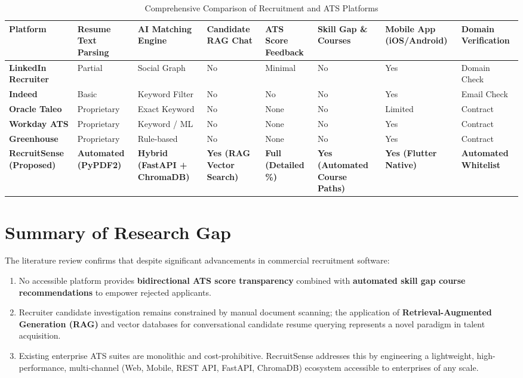 \begin{table}[h!]
\centering
\scriptsize
\caption{Comprehensive Comparison of Recruitment and ATS Platforms}
\label{tab:comparison_marketplaces}
\begin{tabular}{|p{2.6cm}|p{1.4cm}|p{1.8cm}|p{1.8cm}|p{1.6cm}|p{1.6cm}|p{1.6cm}|p{1.6cm}|}
\hline
\textbf{Platform} & \textbf{Resume Text Parsing} & \textbf{AI Matching Engine} & \textbf{Candidate RAG Chat} & \textbf{ATS Score Feedback} & \textbf{Skill Gap \& Courses} & \textbf{Mobile App (iOS/Android)} & \textbf{Domain Verification} \\ \hline
\textbf{LinkedIn Recruiter} & Partial & Social Graph & No & Minimal & No & Yes & Domain Check \\ \hline
\textbf{Indeed} & Basic & Keyword Filter & No & No & No & Yes & Email Check \\ \hline
\textbf{Oracle Taleo} & Proprietary & Exact Keyword & No & None & No & Limited & Contract \\ \hline
\textbf{Workday ATS} & Proprietary & Keyword / ML & No & None & No & Yes & Contract \\ \hline
\textbf{Greenhouse} & Proprietary & Rule-based & No & None & No & Yes & Contract \\ \hline
\textbf{RecruitSense (Proposed)} & \textbf{Automated (PyPDF2)} & \textbf{Hybrid (FastAPI + ChromaDB)} & \textbf{Yes (RAG Vector Search)} & \textbf{Full (Detailed \%)} & \textbf{Yes (Automated Course Paths)} & \textbf{Yes (Flutter Native)} & \textbf{Automated Whitelist} \\ \hline
\end{tabular}
\end{table}

\section{Summary of Research Gap}
The literature review confirms that despite significant advancements in commercial recruitment software:
\begin{enumerate}
    \item No accessible platform provides \textbf{bidirectional ATS score transparency} combined with \textbf{automated skill gap course recommendations} to empower rejected applicants.
    \item Recruiter candidate investigation remains constrained by manual document scanning; the application of \textbf{Retrieval-Augmented Generation (RAG)} and vector databases for conversational candidate resume querying represents a novel paradigm in talent acquisition.
    \item Existing enterprise ATS suites are monolithic and cost-prohibitive. RecruitSense addresses this by engineering a lightweight, high-performance, multi-channel (Web, Mobile, REST API, FastAPI, ChromaDB) ecosystem accessible to enterprises of any scale.
\end{enumerate}
